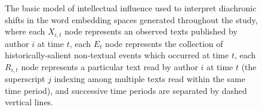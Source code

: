 \begin{figure}[ht!]
	\caption{The basic model of intellectual influence used to interpret diachronic shifts in the word embedding spaces generated throughout the study, where each $X_{i,t}$ node represents an observed texts published by author $i$ at time $t$, each $E_t$ node represents the collection of historically-salient non-textual events which occurred at time $t$, each $R_{i,t}$ node represents a particular text read by author $i$ at time $t$ (the superscript $j$ indexing among multiple texts read within the same time period), and successive time periods are separated by dashed vertical lines.}
	\label{fig:pgm-influence}
\end{figure}
